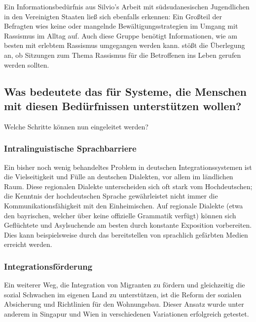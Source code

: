 Ein Informationsbedürfnis aus Silvio's Arbeit mit südsudanesischen Jugendlichen in den Vereinigten Staaten ließ sich ebenfalls erkennen: Ein Großteil der Befragten wies keine oder mangelnde Bewältigungsstrategien im Umgang mit Rassismus im Alltag auf. Auch diese Gruppe benötigt Informationen, wie am besten mit erlebtem Rassismus umgegangen werden kann.\newline
\citet{hakim2006information} stößt die Überlegung an, ob Sitzungen zum Thema Rassismus für die Betroffenen ins Leben gerufen werden sollten.

\subsection{Was bedeutete das für Systeme, die Menschen mit diesen Bedürfnissen unterstützen wollen?}
Welche Schritte können nun eingeleitet werden?\newline

\subsubsection{Intralinguistische Sprachbarriere}
Ein bisher noch wenig behandeltes Problem in deutschen Integrationssystemen ist die Vielseitigkeit und Fülle an deutschen Dialekten, vor allem im ländlichen Raum. Diese regionalen Dialekte unterscheiden sich oft stark vom Hochdeutschen; die Kenntnis der hochdeutschen Sprache gewährleistet nicht immer die Kommunikationsfähigkeit mit den Einheimischen.\newline
Auf regionale Dialekte (etwa den bayrischen, welcher über keine offizielle Grammatik verfügt) können sich Geflüchtete und Asylsuchende am besten durch konstante Exposition vorbereiten. Dies kann beispielsweise durch das bereitstellen von sprachlich gefärbten Medien erreicht werden.\newline \newline
\subsubsection{Integrationsförderung}
Ein weiterer Weg, die Integration von Migranten zu fördern und gleichzeitig die sozial Schwachen im eigenen Land zu unterstützen, ist die Reform der sozialen Absicherung  und Richtlinien für den Wohnungsbau. Dieser Ansatz wurde unter anderem in Singapur \citep{vasoo2001singapore} \citep{yuen2005squatters} \citep{phang2001housing} und Wien \citep{reinprecht2007social} in verschiedenen Variationen erfolgreich getestet.\newline

